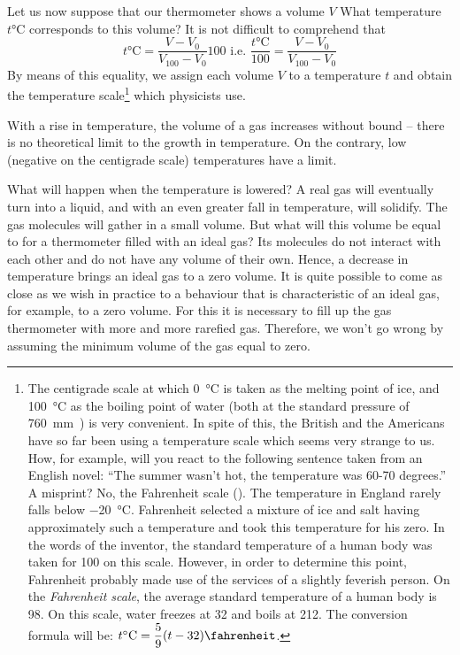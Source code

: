 Let us now suppose that our thermometer shows a volume $V$ What temperature $t\si{\celsius}$  corresponds to this volume? It is not difficult to comprehend that
\begin{equation*}%
t \si{\celsius} = \frac{V - V_{0}}{V_{100}-V_{0}} 100 \,\, \text{i.e.} \,\, \frac{t\si{\celsius}}{100} = \frac{V - V_{0}}{V_{100}-V_{0}}
\end{equation*}
By means of this equality, we assign each volume $V$ to a temperature $t$ and obtain the temperature scale\footnote{The centigrade scale at which \SI{0}{\celsius} is taken as the melting point of ice, and \SI{100}{\celsius} as the boiling point of water (both at the standard pressure of \SI{760}{\milli\meter\mercury}) is very convenient. In spite of this, the British and the Americans have so far been using a temperature scale which seems very strange to us. How, for example, will you react to the following sentence taken from an English novel: ``The summer wasn’t hot, the temperature was 60-70 degrees.'' A misprint? No, the Fahrenheit scale (\si{\fahrenheit}). The temperature in England rarely falls below \SI{-20}{\celsius}. Fahrenheit selected a mixture of ice and salt having approximately such a temperature and took this temperature for his zero. In the words of the inventor, the standard temperature of a human body was taken for 100 on this scale. However, in order to determine this point, Fahrenheit probably made use of the services of a slightly feverish person. On the \emph{Fahrenheit scale}, the average standard temperature of a human body is \SI{98}{\fahrenheit}. On this scale, water freezes at \SI{+32}{\fahrenheit} and boils at \SI{212}{\fahrenheit}. The conversion formula will be: 
$t \si{\celsius}= \dfrac{5}{9} (t - 32) \si{\fahrenheit}$.}
which physicists use.

With a rise in temperature, the volume of a gas increases without bound -- there is no theoretical limit to the growth in temperature. On the contrary, low (negative on the centigrade scale) temperatures have a limit.

What will happen when the temperature is lowered? A real gas will eventually turn into a liquid, and with an even greater fall in temperature, will solidify. The gas molecules will gather in a small volume. But what will this volume be equal to for a thermometer filled with an ideal gas? Its molecules do not interact with each other and do not have any volume of their own. Hence, a decrease in temperature brings an ideal gas to a zero vol­ume. It is quite possible to come as close as we wish in practice to a behaviour that is characteristic of an ideal gas, for example, to a zero volume. For this it is necessary to fill up the gas thermometer with more and more rare­fied gas. Therefore, we won’t go wrong by assuming the minimum volume of the gas equal to zero.

